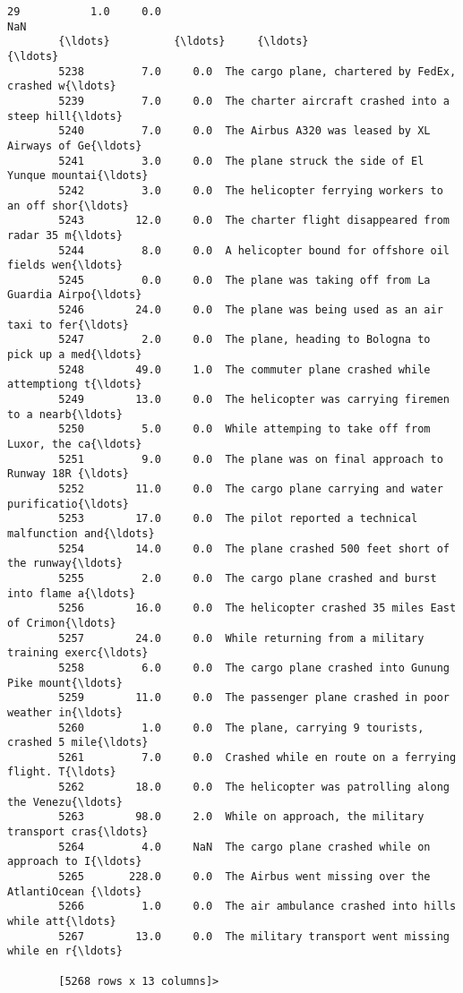 \documentclass[11pt]{article}
\begin{document}
\begin{Verbatim}[commandchars=\\\{\}]
        29           1.0     0.0                                                NaN  
        {\ldots}          {\ldots}     {\ldots}                                                {\ldots}  
        5238         7.0     0.0  The cargo plane, chartered by FedEx, crashed w{\ldots}  
        5239         7.0     0.0  The charter aircraft crashed into a steep hill{\ldots}  
        5240         7.0     0.0  The Airbus A320 was leased by XL Airways of Ge{\ldots}  
        5241         3.0     0.0  The plane struck the side of El Yunque mountai{\ldots}  
        5242         3.0     0.0  The helicopter ferrying workers to an off shor{\ldots}  
        5243        12.0     0.0  The charter flight disappeared from radar 35 m{\ldots}  
        5244         8.0     0.0  A helicopter bound for offshore oil fields wen{\ldots}  
        5245         0.0     0.0  The plane was taking off from La Guardia Airpo{\ldots}  
        5246        24.0     0.0  The plane was being used as an air taxi to fer{\ldots}  
        5247         2.0     0.0  The plane, heading to Bologna to pick up a med{\ldots}  
        5248        49.0     1.0  The commuter plane crashed while attemptiong t{\ldots}  
        5249        13.0     0.0  The helicopter was carrying firemen to a nearb{\ldots}  
        5250         5.0     0.0  While attemping to take off from Luxor, the ca{\ldots}  
        5251         9.0     0.0  The plane was on final approach to Runway 18R {\ldots}  
        5252        11.0     0.0  The cargo plane carrying and water purificatio{\ldots}  
        5253        17.0     0.0  The pilot reported a technical malfunction and{\ldots}  
        5254        14.0     0.0  The plane crashed 500 feet short of the runway{\ldots}  
        5255         2.0     0.0  The cargo plane crashed and burst into flame a{\ldots}  
        5256        16.0     0.0  The helicopter crashed 35 miles East of Crimon{\ldots}  
        5257        24.0     0.0  While returning from a military training exerc{\ldots}  
        5258         6.0     0.0  The cargo plane crashed into Gunung Pike mount{\ldots}  
        5259        11.0     0.0  The passenger plane crashed in poor weather in{\ldots}  
        5260         1.0     0.0  The plane, carrying 9 tourists, crashed 5 mile{\ldots}  
        5261         7.0     0.0  Crashed while en route on a ferrying flight. T{\ldots}  
        5262        18.0     0.0  The helicopter was patrolling along the Venezu{\ldots}  
        5263        98.0     2.0  While on approach, the military transport cras{\ldots}  
        5264         4.0     NaN  The cargo plane crashed while on approach to I{\ldots}  
        5265       228.0     0.0  The Airbus went missing over the AtlantiOcean {\ldots}  
        5266         1.0     0.0  The air ambulance crashed into hills while att{\ldots}  
        5267        13.0     0.0  The military transport went missing while en r{\ldots}  
        
        [5268 rows x 13 columns]>
\end{Verbatim}
            
\end{document}
